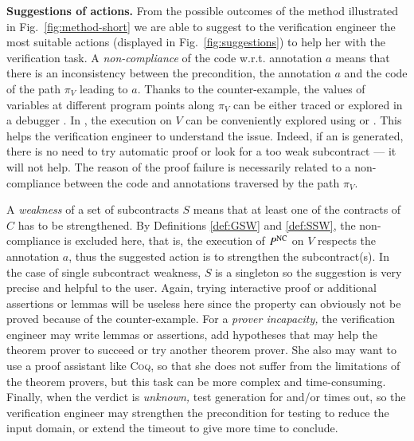 \textbf{Suggestions of actions.}
From the possible outcomes of the method illustrated in
Fig.~\ref{fig:method-short} we are able to suggest to the verification engineer 
the most suitable actions (displayed in Fig.~\ref{fig:suggestions})
to help her with the verification task.
A \emph{non-compliance} of the code w.r.t. annotation $a$  means that 
there is an inconsistency between the precondition, the annotation $a$ and the code 
of the path $\pi_V$  leading to $a$.
Thanks to the counter-example, 
the values of variables at different program points along $\pi_V$ 
can be either traced or explored in a debugger \cite{Muller/FM11}. 
In \framac, the execution on $V$ can be 
conveniently explored using \Value or \pathcrawler.
This helps the verification engineer to understand the issue.
Indeed, if an \NCCE is generated, there is no need to
try automatic proof or look for a too weak subcontract --- it will not help.
The reason of the proof failure is necessarily related 
to a non-compliance between 
the code and annotations
traversed by the path $\pi_V$.

A \emph{weakness} of a set of subcontracts $S$ means that at least one of the contracts of $C$
has to be strengthened. By Definitions \ref{def:GSW} and \ref{def:SSW}, the non-compliance is excluded here, 
that is, the execution of $P^{\mathrm{NC}}$ on  $V$  respects the annotation $a$, thus
the suggested action is to strengthen the subcontract(s).
In the case of single subcontract weakness, $S$ is a singleton so the suggestion
is very precise and helpful to the user.
Again, trying interactive proof or additional assertions or lemmas 
will be useless here since the property can obviously not be proved 
because of the counter-example.
For a \emph{prover incapacity,} the verification engineer
may write lemmas or assertions, add hypotheses that may help the theorem prover to
succeed or try another theorem prover.
She also may want to use a proof assistant like \textsc{Coq}, so that she does
not suffer from the limitations of the theorem provers, but 
this task can be more complex and time-consuming.
Finally, when the verdict is \emph{unknown,} test generation for \NCD and/or \SWD times out, 
so the verification engineer may strengthen the
precondition for testing to reduce the input domain, or extend the timeout to
give \stady more time to conclude.


